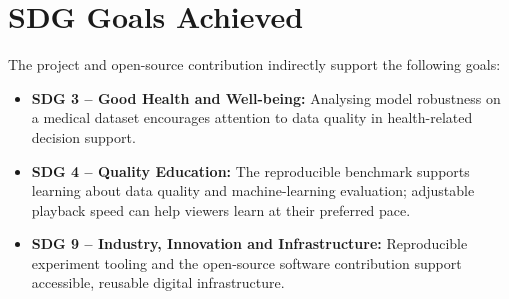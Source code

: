 \section{SDG Goals Achieved}
The project and open-source contribution indirectly support the following goals:
\begin{itemize}
\item \textbf{SDG 3 -- Good Health and Well-being:} Analysing model robustness on a medical dataset encourages attention to data quality in health-related decision support.
\item \textbf{SDG 4 -- Quality Education:} The reproducible benchmark supports learning about data quality and machine-learning evaluation; adjustable playback speed can help viewers learn at their preferred pace.
\item \textbf{SDG 9 -- Industry, Innovation and Infrastructure:} Reproducible experiment tooling and the open-source software contribution support accessible, reusable digital infrastructure.
\end{itemize}

